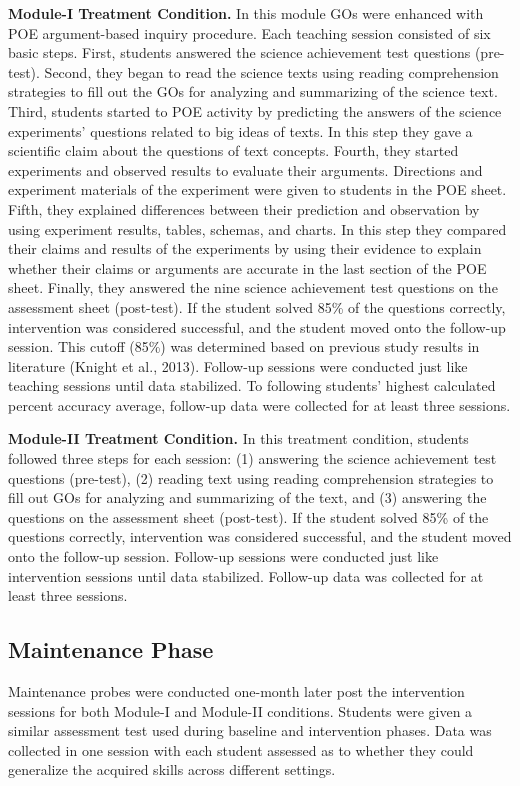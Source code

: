 \documentclass[11.5pt]{sig-alternate} %
\begin{document}
\begin{large}
\textbf{Module-I Treatment Condition.} In this module GOs were enhanced with POE argument-based inquiry procedure. Each teaching session consisted of six basic steps. First, students answered the science achievement test questions (pre-test). Second, they began to read the science texts using reading comprehension strategies to fill out the GOs for analyzing and summarizing of the science text. Third, students started to POE activity by predicting the answers of the science experiments’ questions related to big ideas of texts. In this step they gave a scientific claim about the questions of text concepts. Fourth, they started experiments and observed results to evaluate their arguments. Directions and experiment materials of the experiment were given to students in the POE sheet. Fifth, they explained differences between their prediction and observation by using experiment results, tables, schemas, and charts. In this step they compared their claims and results of the experiments by using their evidence to explain whether their claims or arguments are accurate in the last section of the POE sheet. Finally, they answered the nine science achievement test questions on the assessment sheet (post-test). If the student solved 85\% of the questions correctly, intervention was considered successful, and the student moved onto the follow-up session. This cutoff (85\%) was determined based on previous study results in literature (Knight et al., 2013). Follow-up sessions were conducted just like teaching sessions until data stabilized. To following students’ highest calculated percent accuracy average, follow-up data were collected for at least three sessions. 

\textbf{Module-II Treatment Condition.} In this treatment condition, students followed three steps for each session: (1) answering the science achievement test questions (pre-test), (2) reading text using reading comprehension strategies to fill out GOs for analyzing and summarizing of the text, and (3) answering the questions on the assessment sheet (post-test). If the student solved 85\% of the questions correctly, intervention was considered successful, and the student moved onto the follow-up session. Follow-up sessions were conducted just like intervention sessions until data stabilized. Follow-up data was collected for at least three sessions. 

\subsection*{Maintenance Phase}
Maintenance probes were conducted one-month later post the intervention sessions for both Module-I and Module-II conditions. Students were given a similar assessment test used during baseline and intervention phases. Data was collected in one session with each student assessed as to whether they could generalize the acquired skills across different settings. 


\end{large}
\end{document}
